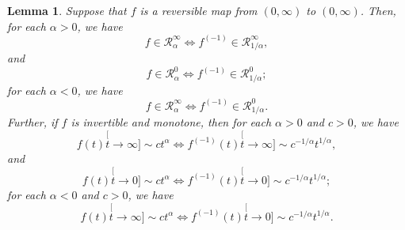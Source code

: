 \documentclass[12pt, a4paper]{amsart}
\newtheorem{lem}[thm]{Lemma}
\theoremstyle{definition}
\numberwithin{equation}{section}
\begin{document}
\begin{lem}
\label{lem: regularly variation and inverse}
	Suppose that $f$ is a reversible map from $(0,\infty)$ to $(0,\infty)$. Then, for each $\alpha > 0$, we have
\[ \label{eq: inverse of a regularly varying function at infinity with alpha > 0}
	f
	\in \mathcal R^\infty_{\alpha}
	\iff f^{(-1)}
	\in \mathcal R^\infty_{1/\alpha},
\]
	and
\[ \label{eq: inverse of a regularly varying function at 0 with alpha > 0}
	f
	\in \mathcal R^0_{\alpha}
	\iff f^{(-1)}
	\in \mathcal R^0_{1/\alpha};
\]
	for each $\alpha < 0$, we have
\[ \label{eq: inverse of a regularly varying function with alpha < 0}
	f
	\in \mathcal R^\infty_{\alpha}
	\iff f^{(-1)}
	\in \mathcal R^0_{1/\alpha}.
\]
	Further, if $f$ is invertible and monotone, then for each $\alpha > 0$ and $c > 0$, we have
\[\label{eq: inverse and power equivalent at infinity with alpha > 0}
	f(t)
	\stackrel[t\to \infty]{}{\sim} c t^\alpha
	\iff f^{(-1)}(t)
	\stackrel[t\to \infty]{}{\sim} c^{-1/\alpha} t^{1/\alpha},
\]
	and
\[\label{eq: inverse and power equivalent at 0 with alpha > 0}
	f(t)
	\stackrel[t\to 0]{}{\sim} c t^\alpha
	\iff f^{(-1)}(t)
	\stackrel[t\to 0]{}{\sim} c^{-1/\alpha} t^{1/\alpha};
\]
	for each $\alpha < 0$ and $c > 0$, we have
\[\label{eq: inverse and power equivalent with alpha < 0}
	f(t)
	\stackrel[t\to \infty]{}{\sim} c t^\alpha
	\iff f^{(-1)}(t)
	\stackrel[t\to 0]{}{\sim} c^{-1/\alpha} t^{1/\alpha}.
\]
\end{lem}
\end{document}
